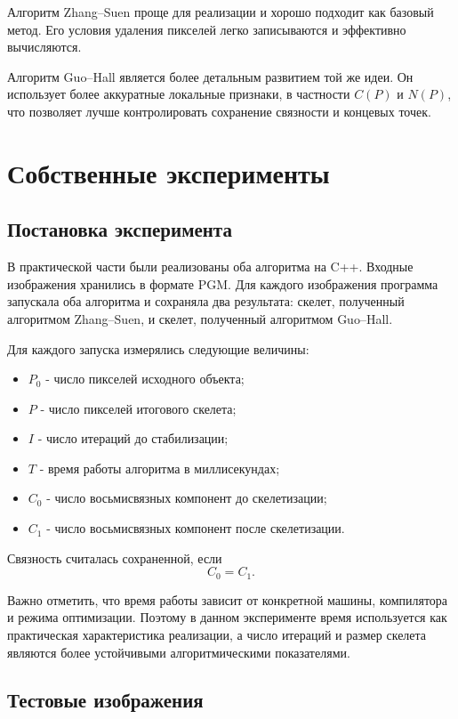 \documentclass[12pt,a4paper]{article}
\begin{document}
Алгоритм Zhang--Suen проще для реализации и хорошо подходит как базовый метод. Его условия удаления пикселей легко записываются и эффективно вычисляются.

Алгоритм Guo--Hall является более детальным развитием той же идеи. Он использует более аккуратные локальные признаки, в частности $C(P)$ и $N(P)$, что позволяет лучше контролировать сохранение связности и концевых точек.

\section{Собственные эксперименты}

\subsection{Постановка эксперимента}

В практической части были реализованы оба алгоритма на C++. Входные изображения хранились в формате PGM. Для каждого изображения программа запускала оба алгоритма и сохраняла два результата: скелет, полученный алгоритмом Zhang--Suen, и скелет, полученный алгоритмом Guo--Hall.

Для каждого запуска измерялись следующие величины:

\begin{itemize}
    \item $P_0$ - число пикселей исходного объекта;
    \item $P$ - число пикселей итогового скелета;
    \item $I$ - число итераций до стабилизации;
    \item $T$ - время работы алгоритма в миллисекундах;
    \item $C_0$ - число восьмисвязных компонент до скелетизации;
    \item $C_1$ - число восьмисвязных компонент после скелетизации.
\end{itemize}

Связность считалась сохраненной, если
\[
    C_0 = C_1.
\]

Важно отметить, что время работы зависит от конкретной машины, компилятора и режима оптимизации. Поэтому в данном эксперименте время используется как практическая характеристика реализации, а число итераций и размер скелета являются более устойчивыми алгоритмическими показателями.

\subsection{Тестовые изображения}
\end{document}
